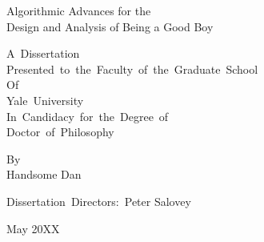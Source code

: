 \begin{titlepage}
	\begin{center}
		
		Algorithmic Advances for the  \\ Design and Analysis of Being a Good Boy
		\par\vfill
		A~Dissertation\\
		Presented~to~the~Faculty~of~the~Graduate~School\\
		Of\\
		Yale~University\\
		In~Candidacy~for~the~Degree~of\\
		Doctor~of~Philosophy
		\par\vfill
		By\\
		Handsome Dan
		\par\vspace{1.5em}
		Dissertation~Directors:~Peter Salovey
		\par\vspace{1.5em}
		May 20XX
		\vspace*{1cm}
		
%		
%		
%		
%		
%		
%		
%		
		
	\end{center}
\end{titlepage}
